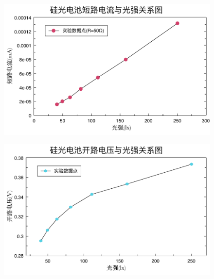 \documentclass[UTF8]{ctexart}
\begin{document}
    \begin{figure}[ht]
        \centering 
        \includegraphics[width=13cm]{光强-短路电流.pdf}
    \end{figure}
    \begin{figure}[ht]
        \centering 
        \includegraphics[width=13cm]{光强-开路电压.pdf}
    \end{figure}
   

    
\end{document}

